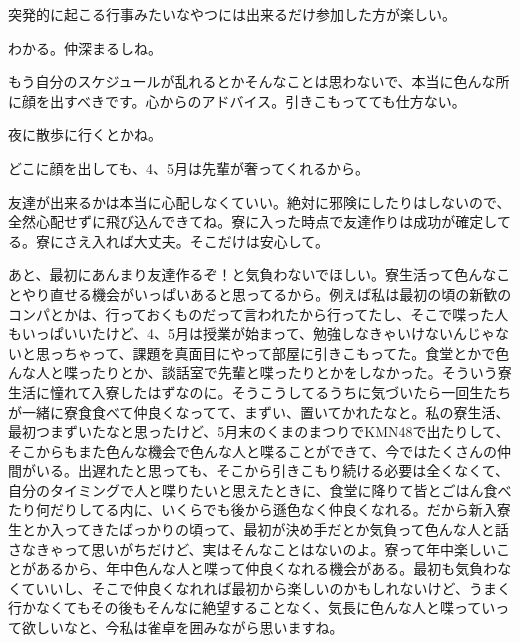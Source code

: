 \begin{multicols}{2}
突発的に起こる行事みたいなやつには出来るだけ参加した方が楽しい。

わかる。仲深まるしね。

もう自分のスケジュールが乱れるとかそんなことは思わないで、本当に色んな所に顔を出すべきです。心からのアドバイス。引きこもってても仕方ない。

夜に散歩に行くとかね。

どこに顔を出しても、4、5月は先輩が奢ってくれるから。


\vspace{15mm}

友達が出来るかは本当に心配しなくていい。絶対に邪険にしたりはしないので、全然心配せずに飛び込んできてね。寮に入った時点で友達作りは成功が確定してる。寮にさえ入れば大丈夫。そこだけは安心して。

あと、最初にあんまり友達作るぞ！と気負わないでほしい。寮生活って色んなことやり直せる機会がいっぱいあると思ってるから。例えば私は最初の頃の新歓のコンパとかは、行っておくものだって言われたから行ってたし、そこで喋った人もいっぱいいたけど、4、5月は授業が始まって、勉強しなきゃいけないんじゃないと思っちゃって、課題を真面目にやって部屋に引きこもってた。食堂とかで色んな人と喋ったりとか、談話室で先輩と喋ったりとかをしなかった。そういう寮生活に憧れて入寮したはずなのに。そうこうしてるうちに気づいたら一回生たちが一緒に寮食食べて仲良くなってて、まずい、置いてかれたなと。私の寮生活、最初つまずいたなと思ったけど、5月末のくまのまつりでKMN48で出たりして、そこからもまた色んな機会で色んな人と喋ることができて、今ではたくさんの仲間がいる。出遅れたと思っても、そこから引きこもり続ける必要は全くなくて、自分のタイミングで人と喋りたいと思えたときに、食堂に降りて皆とごはん食べたり何だりしてる内に、いくらでも後から遜色なく仲良くなれる。だから新入寮生とか入ってきたばっかりの頃って、最初が決め手だとか気負って色んな人と話さなきゃって思いがちだけど、実はそんなことはないのよ。寮って年中楽しいことがあるから、年中色んな人と喋って仲良くなれる機会がある。最初も気負わなくていいし、そこで仲良くなれれば最初から楽しいのかもしれないけど、うまく行かなくてもその後もそんなに絶望することなく、気長に色んな人と喋っていって欲しいなと、今私は雀卓を囲みながら思いますね。


\end{multicols}
